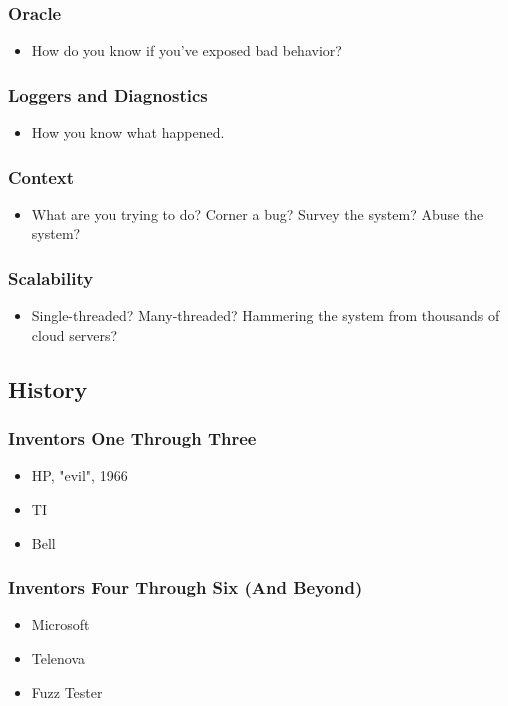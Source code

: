 \begin{frame}
  \frametitle{Oracle}
  \begin{itemize}
    \item How do you know if you've exposed bad behavior?
  \end{itemize}
\end{frame}

\begin{frame}
  \frametitle{Loggers and Diagnostics}
  \begin{itemize}
    \item How you know what happened.
  \end{itemize}
\end{frame}

\begin{frame}
  \frametitle{Context}
  \begin{itemize}
    \item What are you trying to do? Corner a bug? Survey the system? Abuse the system?
  \end{itemize}
\end{frame}

\begin{frame}
  \frametitle{Scalability}
  \begin{itemize}
    \item Single-threaded? Many-threaded? Hammering the system from thousands of cloud servers?
  \end{itemize}\cite{parveen2010migrate}
\end{frame}

\subsection{History}

\begin{frame}
  \frametitle{Inventors One Through Three}
  \begin{itemize}
    \item HP, "evil", 1966
    \item TI
    \item Bell
  \end{itemize}
\end{frame}

\begin{frame}
  \frametitle{Inventors Four Through Six (And Beyond)}
  \begin{itemize}
    \item Microsoft
    \item Telenova
    \item Fuzz Tester \cite{miller1989TR830}
  \end{itemize}
\end{frame}

